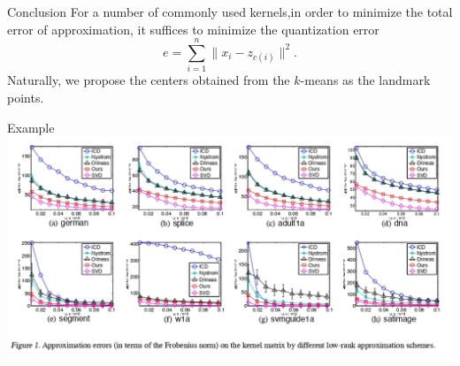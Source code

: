 \documentclass{beamer}
\renewcommand{\v}{\vspace{0.5em}}
\begin{document}
\begin{frame}{Conclusion}
For a number of commonly used kernels,in order to minimize the total error of approximation, it suffices to minimize the quantization error
\begin{equation*}
    e=\sum_{i=1 }^n \|x_i-z_{c(i)}\|^2.
\end{equation*}
Naturally, we propose the centers obtained from the $k$-means as the landmark points.
\v
\end{frame}
\begin{frame}{Example}
    \includegraphics[scale=0.65]{fig1.jpg}
\end{frame}
\end{document}
